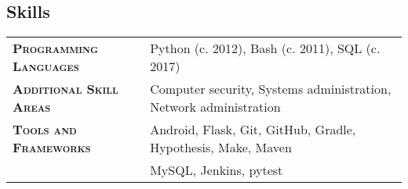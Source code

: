 \documentclass[letterpaper, oneside, final, 10pt]{scrartcl} %
\begin{document}
\begin{center}
\vspace{-16pt} %


\section{Skills}

\begin{tabularx}{\linewidth}{>{\scshape}p{2in}X}
\textbf{Programming Languages} & Python (c. 2012), Bash (c. 2011), SQL (c. 2017)\\
\textbf{Additional Skill Areas} & Computer security, Systems administration, Network administration\\
\textbf{Tools and Frameworks} & Android, Flask, Git, GitHub, Gradle, Hypothesis, Make, Maven\\
							  & MySQL, Jenkins, pytest
\end{tabularx}


\end{center}


\renewcommand{\headfont}{\normalfont\rmfamily\scshape} %


\end{document}
